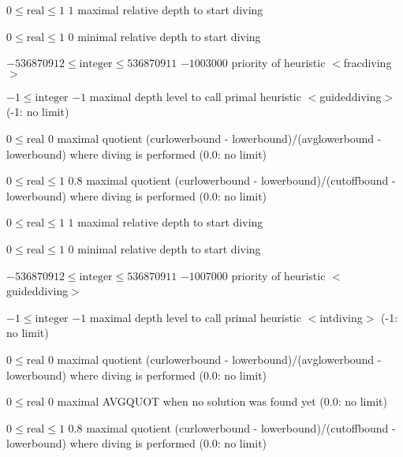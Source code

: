 %
{$0\leq\textrm{real}\leq1$}%
{$1$}%
{maximal relative depth to start diving}%
{}

%
{$0\leq\textrm{real}\leq1$}%
{$0$}%
{minimal relative depth to start diving}%
{}

%
{$-536870912\leq\textrm{integer}\leq536870911$}%
{$-1003000$}%
{priority of heuristic $<$fracdiving$>$}%
{}

%
{$-1\leq\textrm{integer}$}%
{$-1$}%
{maximal depth level to call primal heuristic $<$guideddiving$>$ (-1: no limit)}%
{}

%
{$0\leq\textrm{real}$}%
{$0$}%
{maximal quotient (curlowerbound - lowerbound)/(avglowerbound - lowerbound) where diving is performed (0.0: no limit)}%
{}

%
{$0\leq\textrm{real}\leq1$}%
{$0.8$}%
{maximal quotient (curlowerbound - lowerbound)/(cutoffbound - lowerbound) where diving is performed (0.0: no limit)}%
{}

%
{$0\leq\textrm{real}\leq1$}%
{$1$}%
{maximal relative depth to start diving}%
{}

%
{$0\leq\textrm{real}\leq1$}%
{$0$}%
{minimal relative depth to start diving}%
{}

%
{$-536870912\leq\textrm{integer}\leq536870911$}%
{$-1007000$}%
{priority of heuristic $<$guideddiving$>$}%
{}

%
{$-1\leq\textrm{integer}$}%
{$-1$}%
{maximal depth level to call primal heuristic $<$intdiving$>$ (-1: no limit)}%
{}

%
{$0\leq\textrm{real}$}%
{$0$}%
{maximal quotient (curlowerbound - lowerbound)/(avglowerbound - lowerbound) where diving is performed (0.0: no limit)}%
{}

%
{$0\leq\textrm{real}$}%
{$0$}%
{maximal AVGQUOT when no solution was found yet (0.0: no limit)}%
{}

%
{$0\leq\textrm{real}\leq1$}%
{$0.8$}%
{maximal quotient (curlowerbound - lowerbound)/(cutoffbound - lowerbound) where diving is performed (0.0: no limit)}%
{}

